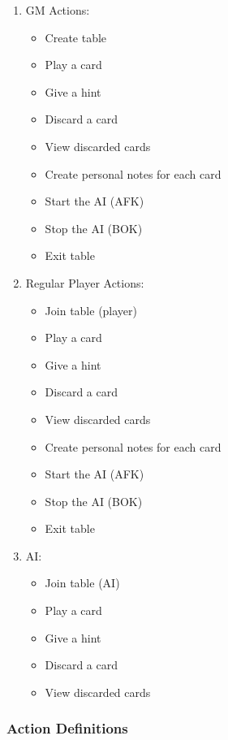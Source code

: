 \documentclass[12pt]{article}
\begin{document}
\begin{enumerate}
\item GM Actions:
\begin{itemize}
\item Create table
\item Play a card
\item Give a hint
\item Discard a card
\item View discarded cards
\item Create personal notes for each card
\item Start the AI (AFK)
\item Stop the AI (BOK)
\item Exit table
\end{itemize}
\item Regular Player Actions:
\begin{itemize}
\item Join table (player)
\item Play a card
\item Give a hint
\item Discard a card
\item View discarded cards
\item Create personal notes for each card
\item Start the AI (AFK)
\item Stop the AI (BOK)
\item Exit table
\end{itemize}  
\item AI:
\begin{itemize}
\item Join table (AI)
\item Play a card
\item Give a hint
\item Discard a card
\item View discarded cards
\end{itemize}
\end{enumerate}

\subsubsection{Action Definitions}
\end{document}
